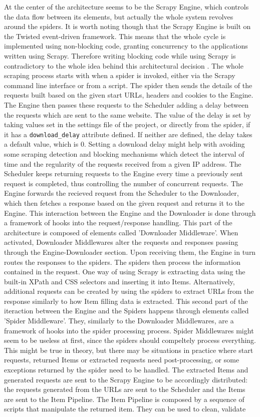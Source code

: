 \documentclass[12pt,a4paper,twoside]{report}
\begin{document}
At the center of the architecture seems to be the Scrapy Engine, which controls the data flow between its elements, but actually the whole system revolves around the spiders. It is worth noting though that the Scrapy Engine is built on the Twisted event-driven framework. This means that the whole cycle is implemented using non-blocking code, granting concurrency to the applications written using Scrapy. Therefore writing blocking code while using Scrapy is contradictory to the whole idea behind this architectural decision \cite{learning_scrapy}. The whole scraping process starts with when a spider is invoked, either via the Scrapy command line interface or from a script. The spider then sends the details of the requests built based on the given start URLs, headers and cookies to the Engine. The Engine then passes these requests to the Scheduler adding a delay between the requests which are sent to the same website. The value of the delay is set by taking values set in the settings file of the project, or directly from the spider, if it has a \lstinline$download_delay$ attribute defined. If neither are defined, the delay takes a default value, which is 0. Setting a download delay might help with avoiding some scraping detection and blocking mechanisms which detect the interval of time and the regularity of the requests received from a given IP address. The Scheduler keeps returning requests to the Engine every time a previously sent request is completed, thus controlling the number of concurrent requests. The Engine forwards the recieved request from the Scheduler to the Downloader, which then fetches a response based on the given request and returns it to the Engine. This interaction between the Engine and the Downloader is done through a framework of hooks into the request/response handling. This part of the architecture is composed of elements called 'Downloader Middleware'. When activated, Downloader Middlewares alter the requests and responses passing through the Engine-Downloader section. Upon receiving them, the Engine in turn routes the responses to the spiders. The spiders then process the information contained in the request. One way of using Scrapy is extracting data using the built-in XPath and CSS selectors and inserting it into Items. Alternatively, additional requests can be created by using the spiders to extract URLs from the response similarly to how Item filling data is extracted. This second part of the iteraction between the Engine and the Spiders happens through elements called 'Spider Middleware'. They, similarly to the Downloader Middlewares, are a framework of hooks into the spider processing process. Spider Middlewares might seem to be useless at first, since the spiders should compeltely process everything. This might be true in theory, but there may be situations in practice where start requests, returned Items or extracted requests need post-processing, or some exceptions returned by the spider need to be handled. The extracted Items and generated requests are sent to the Scrapy Engine to be accordingly distributed: the requests generated from the URLs are sent to the Scheduler and the Items are sent to the Item Pipeline. The Item Pipeline is composed by a sequence of scripts that manipulate the returned item. They can be used to clean, validate 
\end{document}
